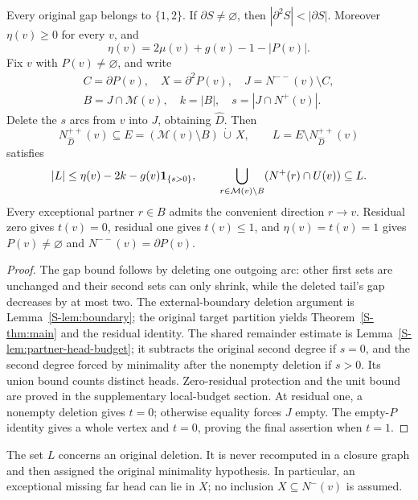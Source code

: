 \begin{lemma}\label{lem:paper-packet}
Every original gap belongs to $\{1,2\}$. If $\partial S\ne\varnothing$,
then $|\partial^2S|<|\partial S|$. Moreover $\eta(v)\ge0$ for every $v$,
and
\[
 \eta(v)=2\mu(v)+g(v)-1-|P(v)|.
\]
Fix $v$ with $P(v)\ne\varnothing$, and write
\[
 \begin{gathered}
 C=\partial P(v),\quad X=\partial^2P(v),\quad J=N^{--}(v)\setminus C,\\
 B=J\cap\mathcal M(v),\quad k=|B|,\quad s=|J\cap N^+(v)|.
 \end{gathered}
\]
Delete the $s$ arcs from $v$ into $J$, obtaining $\widehat D$. Then
\[
 N_{\widehat D}^{++}(v)\subseteq
 E=(\mathcal M(v)\setminus B)\,\dot\cup\,X,
 \qquad L=E\setminus N_{\widehat D}^{++}(v)
\]
satisfies
\begin{equation}\label{eq:paper-packet-bound}
 |L|\le\eta(v)-2k-g(v)\mathbf 1_{\{s>0\}},\qquad
 \bigcup_{r\in\mathcal M(v)\setminus B}(N^+(r)\cap U(v))\subseteq L.
\end{equation}
Every exceptional partner $r\in B$ admits the convenient direction
$r\to v$. Residual zero gives $t(v)=0$, residual one gives $t(v)\le1$,
and $\eta(v)=t(v)=1$ gives $P(v)\ne\varnothing$ and
$N^{--}(v)=\partial P(v)$.
\end{lemma}
\begin{proof}
The gap bound follows by deleting one outgoing arc: other first sets are
unchanged and their second sets can only shrink, while the deleted tail's
gap decreases by at most two. The external-boundary deletion argument is
Lemma~\ref{S-lem:boundary}; the original target partition yields
Theorem~\ref{S-thm:main} and the residual identity. The shared remainder
estimate is Lemma~\ref{S-lem:partner-head-budget}; it subtracts the original
second degree if $s=0$, and the second degree forced by minimality after the
nonempty deletion if $s>0$. Its union bound counts distinct heads.
Zero-residual protection and the unit bound are proved in the supplementary
local-budget section. At residual one, a nonempty deletion gives $t=0$;
otherwise equality forces $J$ empty. The empty-$P$ identity gives a whole
vertex and $t=0$, proving the final assertion when $t=1$.
\end{proof}

The set $L$ concerns an original deletion. It is never recomputed in a
closure graph and then assigned the original minimality hypothesis.
In particular, an exceptional missing far head can lie in $X$; no inclusion
$X\subseteq N^-(v)$ is assumed.

